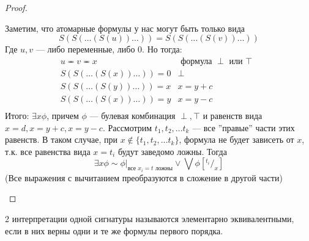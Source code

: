 \begin{proof}
\begin{enumerate}
\begin{enumerate}
            Заметим, что атомарные формулы у нас могут быть только вида $$S(S(\dots(S(u))\dots)) = S(S(\dots(S(v))\dots))$$
            Где $u, v$ --- либо переменные, либо $0$. Но тогда:
            $$\begin{array}{cc}
                u \eqcirc v \eqcirc x & \text{ формула $\perp$ или $\top$ } \\
                S(S(\dots(S(x))\dots)) = 0 & \perp \\
                S(S(\dots(S(y))\dots)) = x & x = y + c\\
                S(S(\dots(S(x))\dots)) = y & x = y - c \\
            \end{array}$$
            Итого: $\exists x \phi$, причем $\phi$ --- булевая комбинация $\perp, \top$ и равенств вида $x = d, x = y + c, x = y - c$. Рассмотрим $t_1, t_2, \dots t_k$ --- все ''правые'' части этих равенств. В таком случае, при $x \not\in \{t_1, t_2, \dots t_k\}$, формула не будет зависеть от $x$, т.к. все равенства вида $x = t_i$ будут заведомо ложны. Тогда 
            $$\exists x \phi \sim \phi|_{\text{все $x_i = t$ ложны}} \vee \bigvee \phi[^{t_i}/_x]$$
            (Все выражения с вычитанием преобразуются в сложение в другой части)
        \end{enumerate}
    \end{enumerate}
\end{proof}

\begin{definition}
    2 интерпретации одной сигнатуры называются элементарно эквивалентными, если в них верны одни и те же формулы первого порядка.
\end{definition}

